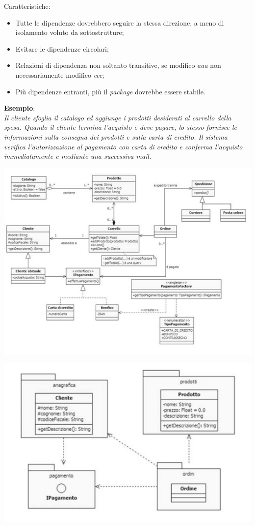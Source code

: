 Caratteristiche:

\begin{itemize}

	\item Tutte le dipendenze dovrebbero seguire la stessa direzione, a meno di isolamento voluto da sottostrutture;
	\item Evitare le dipendenze circolari;
	\item Relazioni di dipendenza non soltanto transitive, se modifico \textit{aaa} non necessariamente modifico \textit{ccc};
	\item Più dipendenze entranti, più il \textit{package} dovrebbe essere stabile.

\end{itemize}






\textbf{Esempio}:\\
\textit{Il cliente sfoglia il catalogo ed aggiunge i prodotti desiderati al carrello della spesa. Quando il cliente termina l’acquisto e deve pagare, lo stesso fornisce le informazioni sulla consegna dei prodotti e sulla carta di credito. Il sistema verifica l’autorizzazione al pagamento con carta di credito e conferma l’acquisto immediatamente e mediante una successiva mail.
}

\begin{center}

\includegraphics[width=0.5\columnwidth]{img4} %

\end{center}

\begin{center}

\includegraphics[width=0.5\columnwidth]{img5} %

\end{center}


